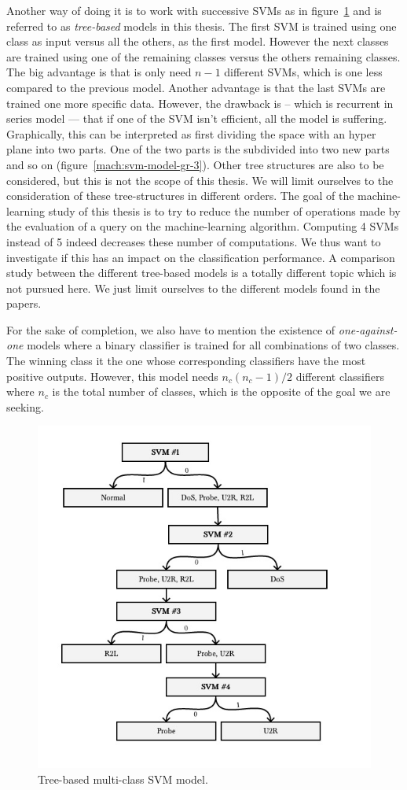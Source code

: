 Another way of doing it is to work with successive SVMs as in figure~\ref{mach:svm-model-2} and is referred to as \emph{tree-based} models in this thesis. The first SVM is trained using one class as input versus all the others, as the first model. However the next classes are trained using one of the remaining classes versus the others remaining classes. The big advantage is that is only need $n-1$ different SVMs, which is one less compared to the previous model. Another advantage is that the last SVMs are trained one more specific data. However, the drawback is -- which is recurrent in series model --- that if one of the SVM isn't efficient, all the model is suffering. Graphically, this can be interpreted as first dividing the space with an hyper plane into two parts. One of the two parts is the subdivided into two new parts and so on (figure~\ref{mach:svm-model-gr-3}). Other tree structures are also to be considered, but this is not the scope of this thesis. We will limit ourselves to the consideration of these tree-structures in different orders. The goal of the machine-learning study of this thesis is to try to reduce the number of operations made by the evaluation of a query on the machine-learning algorithm. Computing 4 SVMs instead of 5 indeed decreases these number of computations. We thus want to investigate if this has an impact on the classification performance. A comparison study between the different tree-based models is a totally different topic which is not pursued here. We just limit ourselves to the different models found in the papers.

For the sake of completion, we also have to mention the existence of \emph{one-against-one} models where a binary classifier is trained for all combinations of two classes. The winning class it the one whose corresponding classifiers have the most positive outputs. However, this model needs $n_c(n_c-1)/2$ different classifiers where $n_c$ is the total number of classes, which is the opposite of the goal we are seeking.


\begin{figure}[ht!]
    \centering
    \includegraphics[width=.75\textwidth]{parts/chap-2/img-2/model-svm-2.jpg}
    \caption{Tree-based multi-class SVM model.} 
    \label{mach:svm-model-2}
\end{figure}

